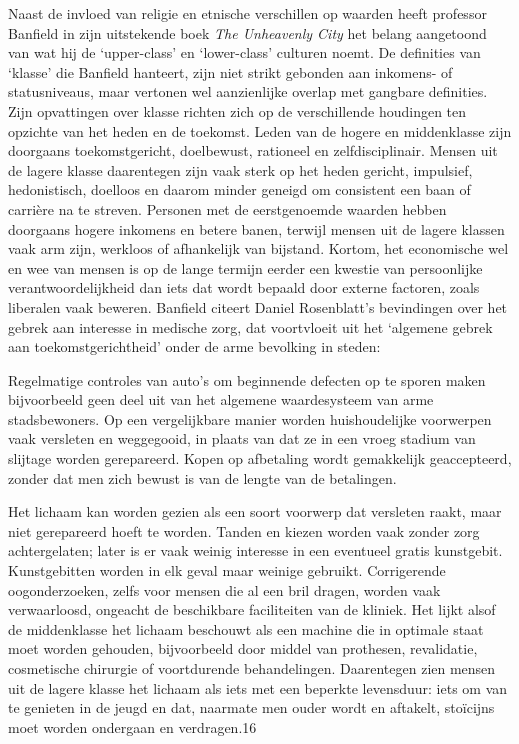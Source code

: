 \documentclass[
  a5paper,
  smalldemyvopaper,10pt,twoside,onecolumn,openright,extrafontsizes,hidelinks]{memoir}
\renewenvironment{quote}%
               {\list{}{\rightmargin=.6cm\leftmargin=.6cm}%
                \itshape \item[]}%
               {\endlist}
\begin{document}
Naast de invloed van religie en etnische verschillen op waarden heeft
professor Banfield in zijn uitstekende boek \emph{The Unheavenly City}
het belang aangetoond van wat hij de `upper-class' en `lower-class'
culturen noemt. De definities van `klasse' die Banfield hanteert, zijn
niet strikt gebonden aan inkomens- of statusniveaus, maar vertonen wel
aanzienlijke overlap met gangbare definities. Zijn opvattingen over
klasse richten zich op de verschillende houdingen ten opzichte van het
heden en de toekomst. Leden van de hogere en middenklasse zijn doorgaans
toekomstgericht, doelbewust, rationeel en zelfdisciplinair. Mensen uit
de lagere klasse daarentegen zijn vaak sterk op het heden gericht,
impulsief, hedonistisch, doelloos en daarom minder geneigd om consistent
een baan of carrière na te streven. Personen met de eerstgenoemde
waarden hebben doorgaans hogere inkomens en betere banen, terwijl mensen
uit de lagere klassen vaak arm zijn, werkloos of afhankelijk van
bijstand. Kortom, het economische wel en wee van mensen is op de lange
termijn eerder een kwestie van persoonlijke verantwoordelijkheid dan
iets dat wordt bepaald door externe factoren, zoals liberalen vaak
beweren. Banfield citeert Daniel Rosenblatt's bevindingen over het
gebrek aan interesse in medische zorg, dat voortvloeit uit het `algemene
gebrek aan toekomstgerichtheid' onder de arme bevolking in steden:

\begin{quote}
Regelmatige controles van auto's om beginnende defecten op te sporen
maken bijvoorbeeld geen deel uit van het algemene waardesysteem van arme
stadsbewoners. Op een vergelijkbare manier worden huishoudelijke
voorwerpen vaak versleten en weggegooid, in plaats van dat ze in een
vroeg stadium van slijtage worden gerepareerd. Kopen op afbetaling wordt
gemakkelijk geaccepteerd, zonder dat men zich bewust is van de lengte
van de betalingen.

Het lichaam kan worden gezien als een soort voorwerp dat versleten
raakt, maar niet gerepareerd hoeft te worden. Tanden en kiezen worden
vaak zonder zorg achtergelaten; later is er vaak weinig interesse in een
eventueel gratis kunstgebit. Kunstgebitten worden in elk geval maar
weinige gebruikt. Corrigerende oogonderzoeken, zelfs voor mensen die al
een bril dragen, worden vaak verwaarloosd, ongeacht de beschikbare
faciliteiten van de kliniek. Het lijkt alsof de middenklasse het lichaam
beschouwt als een machine die in optimale staat moet worden gehouden,
bijvoorbeeld door middel van prothesen, revalidatie, cosmetische
chirurgie of voortdurende behandelingen. Daarentegen zien mensen uit de
lagere klasse het lichaam als iets met een beperkte levensduur: iets om
van te genieten in de jeugd en dat, naarmate men ouder wordt en
aftakelt, stoïcijns moet worden ondergaan en verdragen.16
\end{quote}
\end{document}

